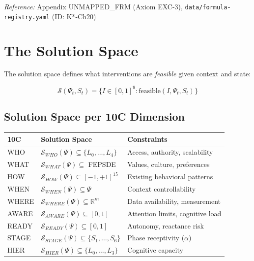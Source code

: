 \textit{Reference:} Appendix UNMAPPED_FRM (Axiom EXC-3), \texttt{data/formula-registry.yaml} (ID: K*-Ch20)

\section{The Solution Space}
\label{sec:mp-solution-space}

The solution space defines what interventions are \textit{feasible} given context and state:

\begin{equation}
\boxed{
\mathcal{S}(\Psi_t, S_t) = \{I \in [0,1]^9 : \text{feasible}(I, \Psi_t, S_t)\}
}
\label{eq:mp-solution-space}
\end{equation}

\subsection{Solution Space per 10C Dimension}

\begin{center}
\renewcommand{\arraystretch}{1.3}
\begin{tabular}{lll}
\toprule
\textbf{10C} & \textbf{Solution Space} & \textbf{Constraints} \\
\midrule
WHO & $\mathcal{S}_{WHO}(\Psi) \subseteq \{L_0, \ldots, L_4\}$ & Access, authority, scalability \\
WHAT & $\mathcal{S}_{WHAT}(\Psi) \subseteq$ FEPSDE & Values, culture, preferences \\
HOW & $\mathcal{S}_{HOW}(\Psi) \subseteq [-1, +1]^{15}$ & Existing behavioral patterns \\
WHEN & $\mathcal{S}_{WHEN}(\Psi) \subseteq \Psi$ & Context controllability \\
WHERE & $\mathcal{S}_{WHERE}(\Psi) \subseteq \mathbb{R}^m$ & Data availability, measurement \\
AWARE & $\mathcal{S}_{AWARE}(\Psi) \subseteq [0,1]$ & Attention limits, cognitive load \\
READY & $\mathcal{S}_{READY}(\Psi) \subseteq [0,1]$ & Autonomy, reactance risk \\
STAGE & $\mathcal{S}_{STAGE}(\Psi) \subseteq \{S_1, \ldots, S_6\}$ & Phase receptivity ($\alpha$) \\
HIER & $\mathcal{S}_{HIER}(\Psi) \subseteq \{L_0, \ldots, L_3\}$ & Cognitive capacity \\
\bottomrule
\end{tabular}
\end{center}

